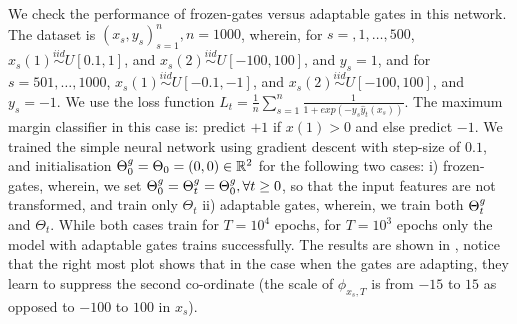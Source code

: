 We check the performance of frozen-gates versus adaptable gates in this network. The dataset is $(x_s,y_s)_{s=1}^{n},n=1000$, wherein, for $s=,1,\ldots,500$, $x_s(1)\stackrel{iid}\sim U[0.1,1]$, and $x_s(2)\stackrel{iid}\sim U[-100,100]$, and $y_s=1$, and for $s=501,\ldots,1000$, $x_s(1)\stackrel{iid}\sim U[-0.1,-1]$, and $x_s(2)\stackrel{iid}\sim U[-100,100]$, and $y_s=-1$. We use the loss function $L_t=\frac{1}{n}\sum_{s=1}^n\frac{1}{1+exp(-y_s\hat{y}_t(x_s))}$. The maximum margin classifier in this case is: predict $+1$ if $x(1)>0$ and else predict $-1$. We trained the simple neural network using gradient descent with step-size of $0.1$, and initialisation ${\Theta}^g_0=\Theta_0=(0,0)\in\mathbb{R}^2$ for the following two cases: i) frozen-gates, wherein, we set ${\Theta}^g_0={\Theta}^g_t={\Theta}^g_0,\forall t\geq 0$, so that the input features are not transformed, and train only $\Theta_t$ ii) adaptable gates, wherein, we train both ${\Theta}^g_t$ and $\Theta_t$. While both cases train for $T=10^4$ epochs, for $T=10^3$ epochs only the model with adaptable gates trains successfully. The results are shown in , notice that the right most plot shows that in the case when the gates are adapting, they learn to suppress the second co-ordinate (the scale of $\phi_{x_s,T}$ is from $-15$ to $15$ as opposed to $-100$ to $100$ in $x_s$).
\FloatBarrier
